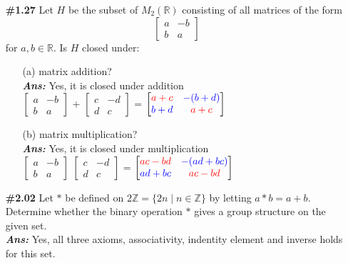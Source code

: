 \documentclass[12pt]{article}
\newcommand{\sol}{\setlength{\parindent}{0cm}\textbf{\textit{Ans:}}\setlength{\parindent}{1cm} }
\begin{document}
\begin{enumerate}[start=1,label={\bfseries Question \arabic*:},leftmargin=1in]
{  }
  \pagebreak
  \item[\textbf{\#1.27}] Let \( H \) be the subset of \( M_2(\mathbb{R}) \) consisting of all matrices of the form 
  \[
  \begin{bmatrix} a & -b \\ b & a \end{bmatrix}
  \]
  for \( a, b \in \mathbb{R} \). Is \( H \) closed under:
  \begin{itemize}
      \item[(a)] matrix addition? \\
      \sol{
        Yes, it is closed under addition\\
        $\begin{bmatrix} a & -b \\ b & a \end{bmatrix}$ + 
        $\begin{bmatrix} c & -d \\ d & c \end{bmatrix}$ = 
        $\begin{bmatrix} \color{red}a+c & \color{blue}-(b+d) \\ \color{blue}b+d & \color{red}a+c \end{bmatrix}$
      }
      \item[(b)] matrix multiplication? \\
      \sol{
        Yes, it is closed under multiplication\\
        $\begin{bmatrix} a & -b \\ b & a \end{bmatrix}$ 
        $\begin{bmatrix} c & -d \\ d & c \end{bmatrix}$ = 
        $\begin{bmatrix} \color{red}ac-bd & \color{blue}-(ad+bc) \\ \color{blue}ad+bc & \color{red}ac-bd \end{bmatrix}$
      }
  \end{itemize}

  \item[\textbf{\#2.02}]
  Let \( * \) be defined on \( 2\mathbb{Z} = \{ 2n \mid n \in \mathbb{Z} \} \) by letting \( a * b = a + b \). 
  Determine whether the binary operation $*$ gives a group structure on the given set.\\
  \sol{
    Yes, all three axioms, associativity, indentity element and inverse holds for this set.
  }
\end{enumerate}
\end{document}
